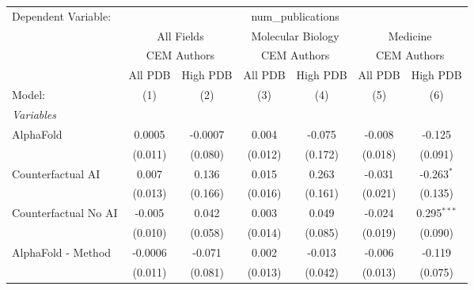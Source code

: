 \begingroup
\centering
\begin{tabular}{lcccccc}
   \tabularnewline \midrule \midrule
   Dependent Variable: & \multicolumn{6}{c}{num\_publications}\\
 & \multicolumn{2}{c}{All Fields} & \multicolumn{2}{c}{Molecular Biology} & \multicolumn{2}{c}{Medicine} \\
\cmidrule(lr){2-3} \cmidrule(lr){4-5} \cmidrule(lr){6-7}
 & \multicolumn{2}{c}{CEM Authors} & \multicolumn{2}{c}{CEM Authors} & \multicolumn{2}{c}{CEM Authors} \\
\cmidrule(lr){2-3} \cmidrule(lr){4-5} \cmidrule(lr){6-7}
 & \multicolumn{1}{c}{All PDB} & \multicolumn{1}{c}{High PDB} & \multicolumn{1}{c}{All PDB} & \multicolumn{1}{c}{High PDB} & \multicolumn{1}{c}{All PDB} & \multicolumn{1}{c}{High PDB} \\
\cmidrule(lr){2-2} \cmidrule(lr){3-3} \cmidrule(lr){4-4} \cmidrule(lr){5-5} \cmidrule(lr){6-6} \cmidrule(lr){7-7}
   Model:                                                     & (1)     & (2)     & (3)     & (4)     & (5)           & (6)\\  
   \midrule
   \emph{Variables}\\
   AlphaFold                                                  & 0.0005  & -0.0007 & 0.004   & -0.075  & -0.008        & -0.125\\   
                                                              & (0.011) & (0.080) & (0.012) & (0.172) & (0.018)       & (0.091)\\   
   Counterfactual AI                                          & 0.007   & 0.136   & 0.015   & 0.263   & -0.031        & -0.263$^{*}$\\   
                                                              & (0.013) & (0.166) & (0.016) & (0.161) & (0.021)       & (0.135)\\   
   Counterfactual No AI                                       & -0.005  & 0.042   & 0.003   & 0.049   & -0.024        & 0.295$^{***}$\\   
                                                              & (0.010) & (0.058) & (0.014) & (0.085) & (0.019)       & (0.090)\\   
   AlphaFold - Method                                         & -0.0006 & -0.071  & 0.002   & -0.013  & -0.006        & -0.119\\   
                                                              & (0.011) & (0.081) & (0.013) & (0.042) & (0.013)       & (0.075)\\   

\end{tabular}
